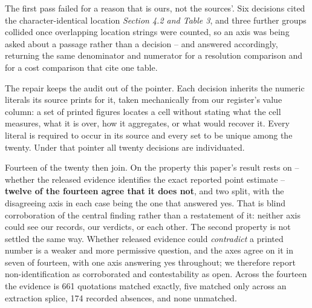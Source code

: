 The first pass failed for a reason that is ours, not the sources'. Six decisions cited the
character-identical location \emph{Section 4.2 and Table 3}, and three further groups collided
once overlapping location strings were counted, so an axis was being asked about a passage
rather than a decision -- and answered accordingly, returning the same denominator and numerator
for a resolution comparison and for a cost comparison that cite one table.

The repair keeps the audit out of the pointer. Each decision inherits the numeric literals its
source prints for it, taken mechanically from our register's value column: a set of printed
figures locates a cell without stating what the cell measures, what it is over, how it
aggregates, or what would recover it. Every literal is required to occur in its source and every
set to be unique among the twenty. Under that pointer all twenty decisions are individuated.

Fourteen of the twenty then join. On the property this paper's result rests on -- whether the
released evidence identifies the exact reported point estimate -- \textbf{twelve of the fourteen
agree that it does not}, and two split, with the disagreeing axis in each case being the one
that answered yes. That is blind corroboration of the central finding rather than a restatement
of it: neither axis could see our records, our verdicts, or each other. The second property is
not settled the same way. Whether released evidence could \emph{contradict} a printed number is
a weaker and more permissive question, and the axes agree on it in seven of fourteen, with one
axis answering yes throughout; we therefore report non-identification as corroborated and
contestability as open. Across the fourteen the evidence is 661 quotations matched exactly,
five matched only across an extraction splice, 174 recorded absences, and none unmatched.

